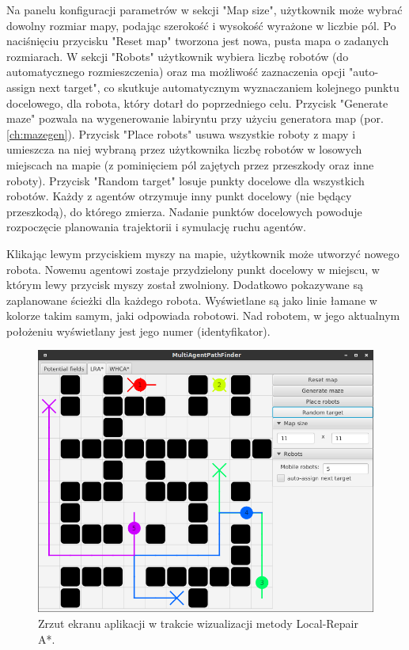 Na panelu konfiguracji parametrów w sekcji "Map size", użytkownik może wybrać dowolny rozmiar mapy, podając szerokość i wysokość wyrażone w liczbie pól.
Po naciśnięciu przycisku "Reset map" tworzona jest nowa, pusta mapa o zadanych rozmiarach.
W sekcji "Robots" użytkownik wybiera liczbę robotów (do automatycznego rozmieszczenia) oraz ma możliwość zaznaczenia opcji "auto-assign next target", co skutkuje automatycznym wyznaczaniem kolejnego punktu docelowego, dla robota, który dotarł do poprzedniego celu.
Przycisk "Generate maze" pozwala na wygenerowanie labiryntu przy użyciu generatora map (por. \ref{ch:mazegen}).
Przycisk "Place robots" usuwa wszystkie roboty z mapy i umieszcza na niej wybraną przez użytkownika liczbę robotów w losowych miejscach na mapie (z pominięciem pól zajętych przez przeszkody oraz inne roboty).
Przycisk "Random target" losuje punkty docelowe dla wszystkich robotów. Każdy z agentów otrzymuje inny punkt docelowy (nie będący przeszkodą), do którego zmierza. Nadanie punktów docelowych powoduje rozpoczęcie planowania trajektorii i symulację ruchu agentów.

Klikając lewym przyciskiem myszy na mapie, użytkownik może utworzyć nowego robota. Nowemu agentowi zostaje przydzielony punkt docelowy w miejscu, w którym lewy przycisk myszy został zwolniony.
Dodatkowo pokazywane są zaplanowane ścieżki dla każdego robota. Wyświetlane są jako linie łamane w kolorze takim samym, jaki odpowiada robotowi.
Nad robotem, w jego aktualnym położeniu wyświetlany jest jego numer (identyfikator).

\begin{figure}
	\centering
	\includegraphics[width=0.8\columnwidth]{img/robopath/ui-lra}
	\caption{Zrzut ekranu aplikacji w trakcie wizualizacji metody Local-Repair A*.}
	\label{fig:robopath-ui-lra}
\end{figure}


